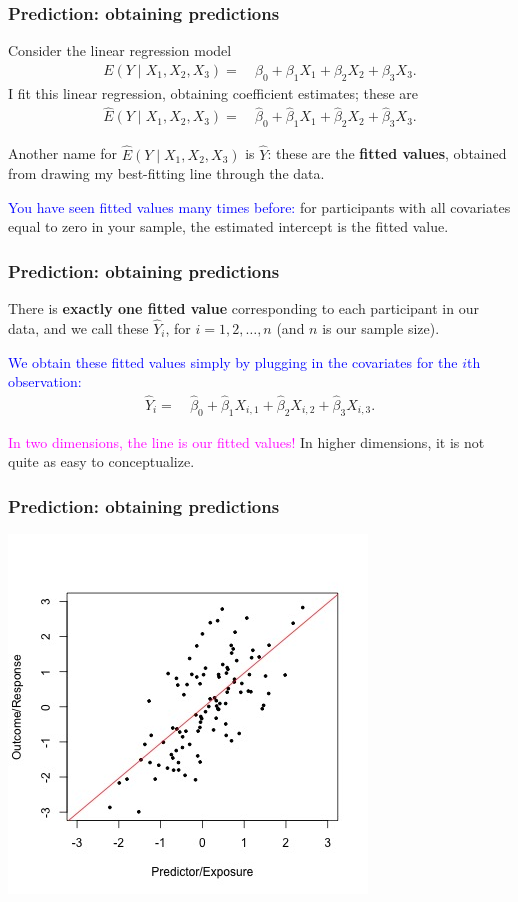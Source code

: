 \documentclass[12pt, 
hyperref={colorlinks=true, linkcolor=blue, urlcolor=cyan},dvipsnames]{beamer}
\begin{document}
\begin{frame}
\frametitle{Prediction: obtaining predictions}
Consider the linear regression model
\begin{align*}
E(Y \mid X_1, X_2, X_3) = & \ \beta_0 + \beta_1 X_1 + \beta_2 X_2 + \beta_3 X_3.
\end{align*}
I fit this linear regression, obtaining coefficient estimates; these are
\begin{align*}
\widehat{E}(Y \mid X_1, X_2, X_3) = & \ \hat{\beta}_0 + \hat{\beta}_1 X_1 + \hat{\beta}_2 X_2 + \hat{\beta}_3 X_3.
\end{align*}

Another name for $\widehat{E}(Y \mid X_1, X_2, X_3)$ is $\widehat{Y}$: these are the \textbf{fitted values}, obtained from drawing my best-fitting line through the data.

\textcolor{blue}{You have seen fitted values many times before:} for participants with all covariates equal to zero in your sample, the estimated intercept is the fitted value.

\end{frame}

\begin{frame}
\frametitle{Prediction: obtaining predictions}
There is \textbf{exactly one fitted value} corresponding to each participant in our data, and we call these $\widehat{Y}_i$, for $i = 1, 2, \dots, n$ (and $n$ is our sample size).

\textcolor{blue}{We obtain these fitted values simply by plugging in the covariates for the $i$th observation:}
\begin{align*}
\widehat{Y}_i = & \  \hat{\beta}_0 + \hat{\beta}_1 X_{i,1} + \hat{\beta}_2 X_{i,2} + \hat{\beta}_3 X_{i,3}.
\end{align*}

\textcolor{magenta}{In two dimensions, the line is our fitted values!} In higher dimensions, it is not quite as easy to conceptualize.
\end{frame}

\begin{frame}
\frametitle{Prediction: obtaining predictions}
\begin{center}
\includegraphics[width=0.7\textheight]{plots/linear-regr.jpg}
\end{center}
\end{frame}
\end{document}
